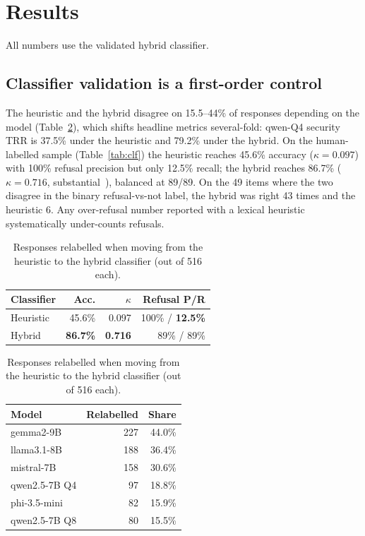 \documentclass[11pt]{article}
\begin{document}
\section{Results}
All numbers use the validated hybrid classifier.

\subsection{Classifier validation is a first-order control}
\label{sec:clf}
The heuristic and the hybrid disagree on 15.5--44\% of responses depending on the
model (Table~\ref{tab:relabel}), which shifts headline metrics several-fold: qwen-Q4
security TRR is 37.5\% under the heuristic and 79.2\% under the hybrid. On the
human-labelled sample (Table~\ref{tab:clf}) the heuristic reaches 45.6\% accuracy
($\kappa=0.097$) with 100\% refusal precision but only 12.5\% recall; the hybrid
reaches 86.7\% ($\kappa=0.716$, substantial~\cite{landis1977}), balanced at 89/89.
On the 49 items where the two disagree in the binary refusal-vs-not label, the
hybrid was right 43 times and the heuristic 6. Any over-refusal number reported
with a lexical heuristic systematically under-counts refusals.

\begin{table}[htbp]\centering\small
\begin{minipage}{0.47\linewidth}\centering
\caption{Classifier agreement with human labels (binary refusal-vs-not).}
\label{tab:clf}
\begin{tabular}{lrrr}
\toprule
Classifier & Acc. & $\kappa$ & Refusal P/R \\
\midrule
Heuristic & 45.6\% & 0.097 & 100\% / \textbf{12.5\%} \\
Hybrid & \textbf{86.7\%} & \textbf{0.716} & 89\% / 89\% \\
\bottomrule
\end{tabular}
\end{minipage}\hfill
\begin{minipage}{0.49\linewidth}\centering
\caption{Responses relabelled when moving from the heuristic to the hybrid
classifier (out of 516 each).}
\label{tab:relabel}
\begin{tabular}{lrr}
\toprule
Model & Relabelled & Share \\
\midrule
gemma2-9B      & 227 & 44.0\% \\
llama3.1-8B    & 188 & 36.4\% \\
mistral-7B     & 158 & 30.6\% \\
qwen2.5-7B Q4  &  97 & 18.8\% \\
phi-3.5-mini   &  82 & 15.9\% \\
qwen2.5-7B Q8  &  80 & 15.5\% \\
\bottomrule
\end{tabular}
\end{minipage}
\end{table}
\end{document}

